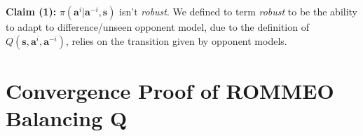 \noindent
\textbf{Claim (1): } $\pi(\boldsymbol{a}^{i} | \boldsymbol{a}^{-i}, \boldsymbol{s})$ isn't \emph{robust}. We defined to term \emph{robust} to be the ability to adapt to difference/unseen opponent model, due to the definition of $Q(\boldsymbol{s}, \boldsymbol{a}^{i}, \boldsymbol{a}^{-i})$, relies on the transition given by opponent models.

\section{Convergence Proof of ROMMEO Balancing Q}


